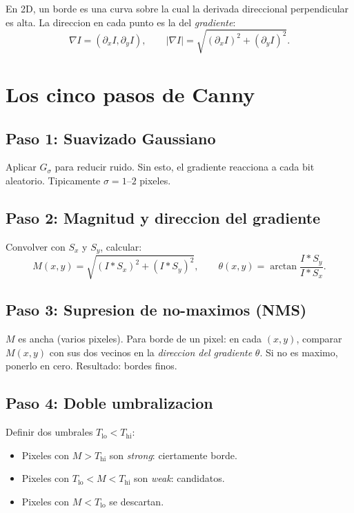 \documentclass[11pt,a4paper,twoside,openright]{book}
\begin{document}
En 2D, un borde es una curva sobre la cual la derivada direccional perpendicular es alta. La direccion en cada punto es la del \emph{gradiente}:
\begin{equation}
\nabla I = (\partial_x I, \partial_y I), \qquad |\nabla I| = \sqrt{(\partial_x I)^2 + (\partial_y I)^2}.
\end{equation}

\section{Los cinco pasos de Canny}

\subsection{Paso 1: Suavizado Gaussiano}
Aplicar $G_\sigma$ para reducir ruido. Sin esto, el gradiente reacciona a cada bit aleatorio. Tipicamente $\sigma = 1$--$2$ pixeles.

\subsection{Paso 2: Magnitud y direccion del gradiente}
Convolver con $S_x$ y $S_y$, calcular:
\begin{equation}
M(x,y) = \sqrt{(I*S_x)^2 + (I*S_y)^2}, \qquad \theta(x,y) = \arctan\!\frac{I*S_y}{I*S_x}.
\end{equation}

\subsection{Paso 3: Supresion de no-maximos (NMS)}
$M$ es ancha (varios pixeles). Para borde de un pixel: en cada $(x,y)$, comparar $M(x,y)$ con sus dos vecinos en la \emph{direccion del gradiente} $\theta$. Si no es maximo, ponerlo en cero. Resultado: bordes finos.

\subsection{Paso 4: Doble umbralizacion}
Definir dos umbrales $T_{\text{lo}} < T_{\text{hi}}$:
\begin{itemize}[leftmargin=2em]
  \item Pixeles con $M > T_{\text{hi}}$ son \emph{strong}: ciertamente borde.
  \item Pixeles con $T_{\text{lo}} < M < T_{\text{hi}}$ son \emph{weak}: candidatos.
  \item Pixeles con $M < T_{\text{lo}}$ se descartan.
\end{itemize}
\end{document}
